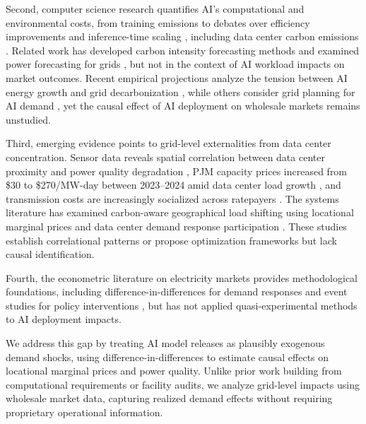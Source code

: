 \documentclass[sigconf,authordraft]{acmart}
\begin{document}
Second, computer science research quantifies AI's computational and environmental costs, from training emissions \cite{strubell19, schwartz2020green} to debates over efficiency improvements \cite{RN2, RN8} and inference-time scaling \cite{kim2025cost}, including data center carbon emissions \cite{datacenter-carbon}. Related work has developed carbon intensity forecasting methods \cite{maji2022dacf, li2023gnn} and examined power forecasting for grids \cite{optimizing-grid, carbon-intensity-forecasting}, but not in the context of AI workload impacts on market outcomes. Recent empirical projections analyze the tension between AI energy growth and grid decarbonization \cite{maji2024crossroads}, while others consider grid planning for AI demand \cite{ai-grid-planning}, yet the causal effect of AI deployment on wholesale markets remains unstudied.

Third, emerging evidence points to grid-level externalities from data center concentration. Sensor data reveals spatial correlation between data center proximity and power quality degradation \cite{nicoletti2024}, PJM capacity prices increased from \$30 to \$270/MW-day between 2023--2024 amid data center load growth \cite{cmu2025}, and transmission costs are increasingly socialized across ratepayers \cite{jacobs2025}. The systems literature has examined carbon-aware geographical load shifting using locational marginal prices \cite{lindberg2021guide} and data center demand response participation \cite{chen2019datacenter, liu2014pricing, klingert2018mapping}. These studies establish correlational patterns or propose optimization frameworks but lack causal identification.

Fourth, the econometric literature on electricity markets provides methodological foundations, including difference-in-differences for demand responses \cite{roth2024did} and event studies for policy interventions \cite{pnnl2022}, but has not applied quasi-experimental methods to AI deployment impacts.

We address this gap by treating AI model releases as plausibly exogenous demand shocks, using difference-in-differences to estimate causal effects on locational marginal prices and power quality. Unlike prior work building from computational requirements or facility audits, we analyze grid-level impacts using wholesale market data, capturing realized demand effects without requiring proprietary operational information.

\end{document}
